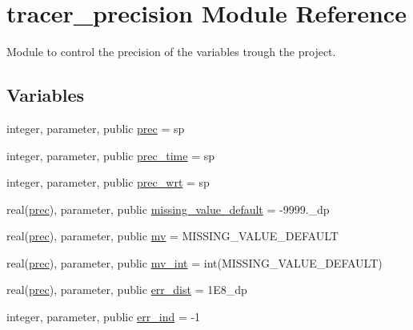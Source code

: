 \hypertarget{namespacetracer__precision}{}\section{tracer\+\_\+precision Module Reference}
\label{namespacetracer__precision}


Module to control the precision of the variables trough the project.  


\subsection*{Variables}
\begin{DoxyCompactItemize}
\item 
integer, parameter, public \mbox{\hyperlink{namespacetracer__precision_a8a01094f67c69ab389329d205a7c4cc6}{prec}} = sp
\item 
integer, parameter, public \mbox{\hyperlink{namespacetracer__precision_acd72fad1267e87137f00ec7d21d5a0cb}{prec\+\_\+time}} = sp
\item 
integer, parameter, public \mbox{\hyperlink{namespacetracer__precision_a57302c8b2d241e00360158d172f89d3c}{prec\+\_\+wrt}} = sp
\item 
real(\mbox{\hyperlink{namespacetracer__precision_a8a01094f67c69ab389329d205a7c4cc6}{prec}}), parameter, public \mbox{\hyperlink{namespacetracer__precision_ac24699f2eab5a0427f3ec0f8f7715a40}{missing\+\_\+value\+\_\+default}} = -\/9999.\+\_\+dp
\item 
real(\mbox{\hyperlink{namespacetracer__precision_a8a01094f67c69ab389329d205a7c4cc6}{prec}}), parameter, public \mbox{\hyperlink{namespacetracer__precision_a783785f78c8f38be24eef86ccd426c6e}{mv}} = M\+I\+S\+S\+I\+N\+G\+\_\+\+V\+A\+L\+U\+E\+\_\+\+D\+E\+F\+A\+U\+LT
\item 
real(\mbox{\hyperlink{namespacetracer__precision_a8a01094f67c69ab389329d205a7c4cc6}{prec}}), parameter, public \mbox{\hyperlink{namespacetracer__precision_abddd3613902872af708334a2c29dc468}{mv\+\_\+int}} = int(M\+I\+S\+S\+I\+N\+G\+\_\+\+V\+A\+L\+U\+E\+\_\+\+D\+E\+F\+A\+U\+LT)
\item 
real(\mbox{\hyperlink{namespacetracer__precision_a8a01094f67c69ab389329d205a7c4cc6}{prec}}), parameter, public \mbox{\hyperlink{namespacetracer__precision_ac58a793d67c36de01068a6315cb0211f}{err\+\_\+dist}} = 1\+E8\+\_\+dp
\item 
integer, parameter, public \mbox{\hyperlink{namespacetracer__precision_a8a4267e1aa9cc99d32b65d07cb31cb2a}{err\+\_\+ind}} = -\/1
\end{DoxyCompactItemize}


